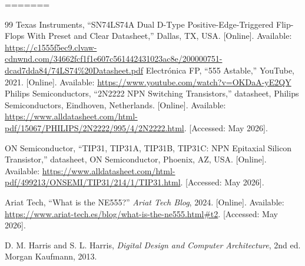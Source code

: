 \documentclass[12pt,onecolumn]{IEEEtran}
\begin{document}
=======

\begin{thebibliography}{99}
Texas Instruments, ``SN74LS74A Dual D-Type Positive-Edge-Triggered Flip-Flops With Preset and Clear Datasheet,'' Dallas, TX, USA. [Online]. Available: \url{https://c1555f5ec9.clvaw-cdnwnd.com/34662fcf1f1e607c561442431023ac8e/200000751-dcad7dda84/74LS74%20Datasheet.pdf}
Electrónica FP, ``555 Astable,'' YouTube, 2021. [Online]. Available: \url{https://www.youtube.com/watch?v=OKDaA-yE2QY}
Philips Semiconductors, ``2N2222 NPN Switching Transistors,'' datasheet, Philips Semiconductors, Eindhoven, Netherlands. [Online]. Available: \url{https://www.alldatasheet.com/html-pdf/15067/PHILIPS/2N2222/995/4/2N2222.html}. [Accessed: May 2026].

ON Semiconductor, ``TIP31, TIP31A, TIP31B, TIP31C: NPN Epitaxial Silicon Transistor,'' datasheet, ON Semiconductor, Phoenix, AZ, USA. [Online]. Available: \url{https://www.alldatasheet.com/html-pdf/499213/ONSEMI/TIP31/214/1/TIP31.html}. [Accessed: May 2026].

Ariat Tech, ``What is the NE555?'' \textit{Ariat Tech Blog}, 2024. [Online]. Available: \url{https://www.ariat-tech.es/blog/what-is-the-ne555.html#t2}. [Accessed: May 2026].


D. M. Harris and S. L. Harris, \textit{Digital Design and Computer
Architecture}, 2nd ed. Morgan Kaufmann, 2013.


\end{thebibliography}
\end{document}
